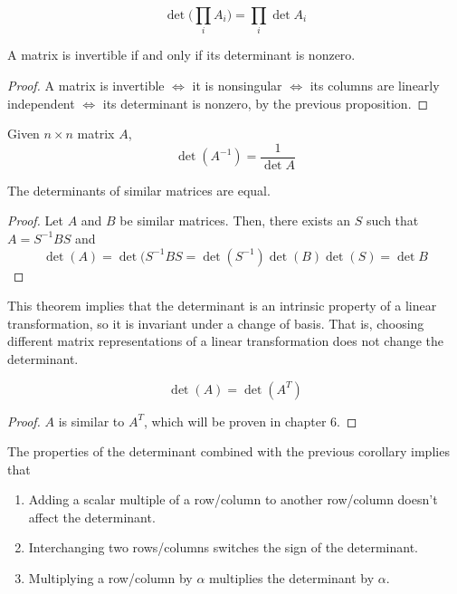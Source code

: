   \begin{theorem}
  \[ \det{\bigg(\prod_i A_i \bigg)} = \prod_i \det{A_i}\]
  \end{theorem}

  \begin{theorem}
  A matrix is invertible if and only if its determinant is nonzero. 
  \end{theorem}
  \begin{proof}
  A matrix is invertible $\iff$ it is nonsingular $\iff$ its columns are linearly independent $\iff$ its determinant is nonzero, by the previous proposition. 
  \end{proof}

  \begin{corollary}
  Given $n \times n$ matrix $A$,
  \[\det{(A^{-1})} = \frac{1}{\det{A}}\]
  \end{corollary}

  \begin{theorem}
  The determinants of similar matrices are equal. 
  \end{theorem}
  \begin{proof}
  Let $A$ and $B$ be similar matrices. Then, there exists an $S$ such that $A = S^{-1} B S$ and 
  \[ \det{(A)} = \det{(S^{-1} B S} = \det{(S^{-1})} \det{(B)} \det{(S)} = \det{B}\]
  \end{proof}

  This theorem implies that the determinant is an intrinsic property of a linear transformation, so it is invariant under a change of basis. That is, choosing different matrix representations of a linear transformation does not change the determinant.  

  \begin{corollary}
  \[\det{(A)} = \det{(A^T)}\]
  \end{corollary}
  \begin{proof}
  $A$ is similar to $A^T$, which will be proven in chapter 6. 
  \end{proof}

  \begin{proposition}
  The properties of the determinant combined with the previous corollary implies that 
  \begin{enumerate}
      \item Adding a scalar multiple of a row/column to another row/column doesn't affect the determinant. 
      \item Interchanging two rows/columns switches the sign of the determinant. 
      \item Multiplying a row/column by $\alpha$ multiplies the determinant by $\alpha$. 
  \end{enumerate}
  \end{proposition}

